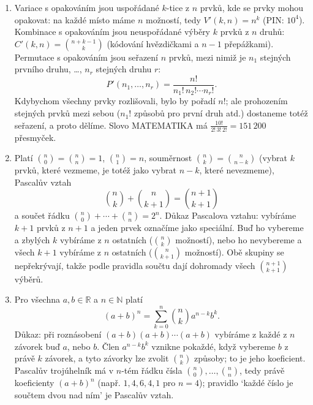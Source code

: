 \begin{enumerate}[label=\textbf{\arabic*.}, leftmargin=*, itemsep=0.8em]
  \item {}
  Variace s opakováním jsou uspořádané $k$-tice z $n$ prvků, kde se prvky mohou opakovat: na každé místo máme $n$ možností, tedy $V'(k, n) = n^k$ (PIN: $10^4$). Kombinace s opakováním jsou neuspořádané výběry $k$ prvků z $n$ druhů: $C'(k, n) = \binom{n + k - 1}{k}$ (kódování hvězdičkami a $n - 1$ přepážkami). Permutace s opakováním jsou seřazení $n$ prvků, mezi nimiž je $n_1$ stejných prvního druhu, \ldots, $n_r$ stejných druhu $r$:
  \begin{equation*}
    P'(n_1, \ldots, n_r) = \frac{n!}{n_1!\,n_2!\cdots n_r!}.
  \end{equation*}
  Kdybychom všechny prvky rozlišovali, bylo by pořadí $n!$; ale prohozením stejných prvků mezi sebou ($n_1!$ způsobů pro první druh atd.) dostaneme totéž seřazení, a proto dělíme. Slovo MATEMATIKA má $\frac{10!}{2!\,3!\,2!} = 151\,200$ přesmyček. 

  \item {}
  Platí $\binom{n}{0} = \binom{n}{n} = 1$, $\binom{n}{1} = n$, souměrnost $\binom{n}{k} = \binom{n}{n - k}$ (vybrat $k$ prvků, které vezmeme, je totéž jako vybrat $n - k$, které nevezmeme), Pascalův vztah
  \begin{equation*}
    \binom{n}{k} + \binom{n}{k + 1} = \binom{n + 1}{k + 1}
  \end{equation*}
  a součet řádku $\binom{n}{0} + \cdots + \binom{n}{n} = 2^n$. Důkaz Pascalova vztahu: vybíráme $k + 1$ prvků z $n + 1$ a jeden prvek označíme jako speciální. Buď ho vybereme a zbylých $k$ vybíráme z $n$ ostatních ($\binom{n}{k}$ možností), nebo ho nevybereme a všech $k + 1$ vybíráme z $n$ ostatních ($\binom{n}{k + 1}$ možností). Obě skupiny se nepřekrývají, takže podle pravidla součtu dají dohromady všech $\binom{n + 1}{k + 1}$ výběrů. 

  \item {}
  Pro všechna $a, b\in\mathbb{R}$ a $n\in\mathbb{N}$ platí
  \begin{equation*}
    {(a + b)}^n = \sum_{k=0}^{n}\binom{n}{k}a^{n-k}b^k.
  \end{equation*}
  Důkaz: při roznásobení $(a + b)(a + b)\cdots(a + b)$ vybíráme z každé z $n$ závorek buď $a$, nebo $b$. Člen $a^{n-k}b^k$ vznikne pokaždé, když vybereme $b$ z právě $k$ závorek, a tyto závorky lze zvolit $\binom{n}{k}$ způsoby; to je jeho koeficient. Pascalův trojúhelník má v $n$-tém řádku čísla $\binom{n}{0}, \ldots, \binom{n}{n}$, tedy právě koeficienty ${(a + b)}^n$ (např. $1, 4, 6, 4, 1$ pro $n = 4$); pravidlo `každé číslo je součtem dvou nad ním' je Pascalův vztah. 


\end{enumerate}

